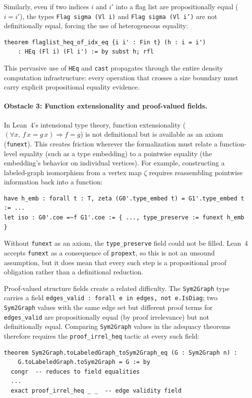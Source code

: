 \documentclass{article}
\newcommand{\lean}[1]{\texttt{#1}}
\begin{document}
Similarly, even if two indices $i$ and $i'$ into a flag list are propositionally
equal ($i = i'$), the types \lean{Flag sigma (Vl i)} and \lean{Flag sigma (Vl i')}
are not definitionally equal, forcing the use of heterogeneous equality:
\begin{lstlisting}
theorem flaglist_heq_of_idx_eq {i i' : Fin t} (h : i = i')
    : HEq (Fl i) (Fl i') := by subst h; rfl
\end{lstlisting}
This pervasive use of \lean{HEq} and \lean{cast} propagates through the entire
density computation infrastructure: every operation that crosses a size
boundary must carry explicit propositional equality evidence.

\paragraph{Obstacle 3: Function extensionality and proof-valued fields.}
In Lean~4's intensional type theory, function extensionality
($(\forall x,\, f\,x = g\,x) \Rightarrow f = g$) is not definitional but is
available as an axiom (\lean{funext}).  This creates friction wherever the
formalization must relate a function-level equality (such as a type embedding)
to a pointwise equality (the embedding's behavior on individual vertices).
For example, constructing a labeled-graph isomorphism from a vertex map $\zeta$
requires reassembling pointwise information back into a function:
\begin{lstlisting}
have h_emb : forall t : T, zeta (G0'.type_embed t) = G1'.type_embed t := ...
let iso : G0'.coe =~f G1'.coe := { ..., type_preserve := funext h_emb }
\end{lstlisting}
Without \lean{funext} as an axiom, the \lean{type\_preserve} field could not
be filled.  Lean~4 accepts \lean{funext} as a consequence of \lean{propext},
so this is not an unsound assumption, but it does mean that every such step is a
propositional proof obligation rather than a definitional reduction.

Proof-valued structure fields create a related difficulty.  The \lean{Sym2Graph}
type carries a field \lean{edges\_valid : forall e in edges, not e.IsDiag}; two
\lean{Sym2Graph} values with the same edge set but different proof terms for
\lean{edges\_valid} are propositionally equal (by proof irrelevance) but not
definitionally equal.  Comparing \lean{Sym2Graph} values in the adequacy
theorems therefore requires the \lean{proof\_irrel\_heq} tactic at every
such field:
\begin{lstlisting}
theorem Sym2Graph.toLabeledGraph_toSym2Graph_eq (G : Sym2Graph n) :
    G.toLabeledGraph.toSym2Graph = G := by
  congr  -- reduces to field equalities
  ...
  exact proof_irrel_heq _ _  -- edge validity field
\end{lstlisting}
\end{document}
